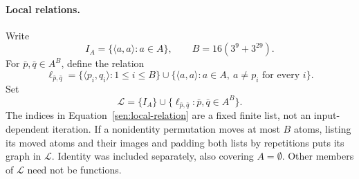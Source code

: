 \paragraph{Local relations.}
Write
\[
 I_A=\{\langle a,a\rangle:a\in A\},\qquad
 B=16(3^9+3^{29}).
\]
For \(\bar p,\bar q\in A^B\), define the relation
\begin{equation}
 \ell_{\bar p,\bar q}
 =\{\langle p_i,q_i\rangle:1\leq i\leq B\}
   \cup
   \{\langle a,a\rangle:a\in A,\ a\ne p_i
                                      \text{ for every }i\}.
 \label{sen:local-relation}
\end{equation}
Set
\[
 \mathcal L=\{I_A\}\cup
       \{\ell_{\bar p,\bar q}:\bar p,\bar q\in A^B\}.
\]
The indices in Equation~\eqref{sen:local-relation} are a fixed finite
list, not an input-dependent iteration. If a nonidentity permutation
moves at most \(B\) atoms, listing its moved atoms and their images and
padding both lists by repetitions puts its graph in \(\mathcal L\).
Identity was included separately, also covering \(A=\emptyset\).
Other members of \(\mathcal L\) need not be functions.

